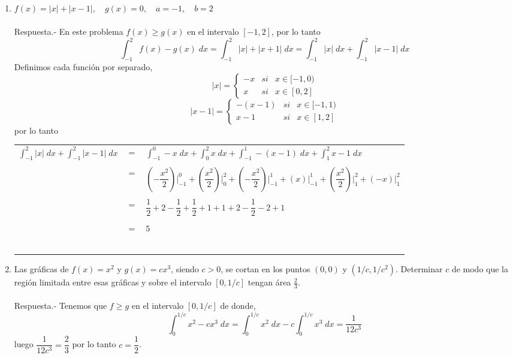 \begin{enumerate}[\bfseries 1.]
\item $f(x) = |x|+|x-1|, \quad g(x)=0, \quad a=-1,\quad b=2$\\\\
    Respuesta.-\; En este problema $f(x)\geq g(x)$ en el intervalo $[-1,2]$, por lo tanto 
    $$\int_{-1}^2 f(x)-g(x)\; dx = \int_{-1}^2 |x| + |x+1|\; dx = \int_{-1}^2 |x|\; dx + \int_{-1}^2 |x-1| \; dx$$
    Definimos cada función por separado,
    $$|x| = \left\{ \begin{array}{rcl} -x & si & x\in [-1,0)\\ x & si & x\in [0,2] \end{array}\right.$$
    $$|x-1| = \left\{ \begin{array}{rcl} -(x-1) & si & x\in [-1,1)\\ x-1 & si & x\in [1,2] \end{array}\right.$$
    por lo tanto
    \begin{center}
	\begin{tabular}{rcl}
	    $\displaystyle\int_{-1}^2 |x|\; dx + \int_{-1}^2 |x-1|\; dx$&$=$&$\displaystyle\int_{-1}^0 -x \; dx + \int_0^2 x\; dx + \int_{-1}^1 -(x-1)\; dx + \int_1^2 x-1\; dx$\\\\
	    &$=$&$\left(-\dfrac{x^2}{2}\right)\bigg|_{-1}^0 + \left(\dfrac{x^2}{2}\right)\bigg|_{0}^2 + \left(-\dfrac{x^2}{2}\right)\bigg|_{-1}^1 + \left(x\right)\bigg|_{-1}^1 + \left(\dfrac{x^2}{2}\right)\bigg|_{1}^2 + \left(-x\right)\bigg|_{1}^2$\\\\\
	    &$=$&$\dfrac{1}{2}+2-\dfrac{1}{2}+\dfrac{1}{2}+1+1+2-\dfrac{1}{2}-2+1$\\\\\
	    &$=$&$5$\\\\\
	\end{tabular}
    \end{center}

\item Las gráficas de $f(x) = x^2$ y $g(x)=cx^3$, siendo $c>0$, se cortan en los puntos $(0,0)$ y $(1/c,1/c^2)$. Determinar $c$ de modo que la región limitada entre esas gráficas y sobre el intervalo $[0,1/c]$ tengan área $\frac{2}{3}$.\\\\
    Respuesta.-\; Tenemos que $f\geq g$ en el intervalo $[0,1/c]$ de donde, 
    $$\int_0^{1/c} x^2 -cx^3 \; dx = \int_0^{1/c} x^2\; dx - c\int_0^{1/c} x^3 \; dx = \dfrac{1}{12c^3}$$
    luego $\dfrac{1}{12c^3}=\dfrac{2}{3}$ por lo tanto $c=\dfrac{1}{2}$.\\\\


\end{enumerate}
